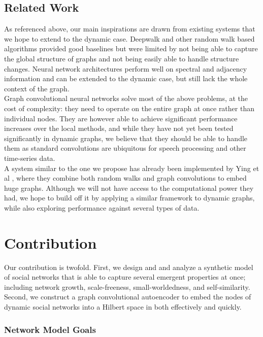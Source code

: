 \documentclass[12pt,twoside]{report}
\begin{document}
\section{Related Work}

As referenced above, our main inspirations are drawn from existing systems that we hope to extend to the dynamic case. Deepwalk and other random walk based algorithms provided good baselines but were limited by not being able to capture the global structure of graphs and not being easily able to handle structure changes. Neural network architectures perform well on spectral and adjacency information and can be extended to the dynamic case, but still lack the whole context of the graph. \\

Graph convolutional neural networks solve most of the above problems, at the cost of complexity: they need to operate on the entire graph at once rather than individual nodes. They are however able to achieve significant performance increases over the local methods, and while they have not yet been tested significantly in dynamic graphs, we believe that they should be able to handle them as standard convolutions are ubiquitous for speech processing and other time-series data. \\

A system similar to the one we propose has already been implemented by Ying et al \cite{ying2018graph}, where they combine both random walks and graph convolutions to embed huge graphs. Although we will not have access to the computational power they had, we hope to build off it by applying a similar framework to dynamic graphs, while also exploring performance against several types of data. \\


\chapter{Contribution}
Our contribution is twofold. First, we design and and analyze a synthetic model of social networks that is able to capture several emergent properties at once; including network growth, scale-freeness, small-worldedness, and self-similarity. Second, we construct a graph convolutional autoencoder to embed the nodes of dynamic social networks into a Hilbert space in both effectively and quickly. \\

\subsection{Network Model Goals}
\end{document}
